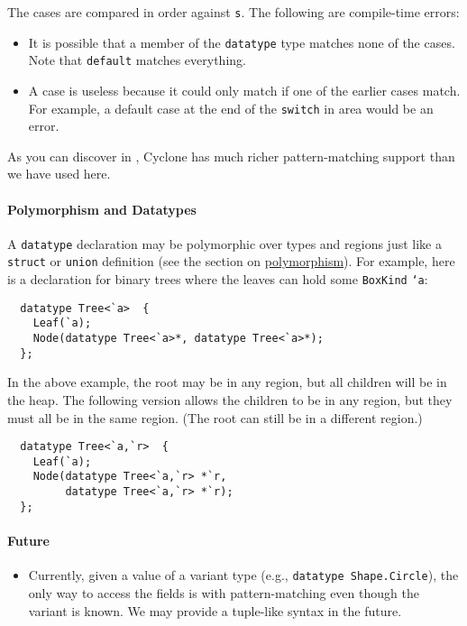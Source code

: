 The cases are compared in order against \texttt{s}.  The following are
compile-time errors:
\begin{itemize}
\item It is possible that a member of the \texttt{datatype} type matches
  none of the cases.  Note that \texttt{default} matches everything.
\item A case is useless because it could only match if one of the
  earlier cases match.  For example, a default case at the end of the
  \texttt{switch} in area would be an error.
\end{itemize}

As you can discover in , Cyclone has much
richer pattern-matching support than we have used here.

\paragraph{Polymorphism and Datatypes} A \texttt{datatype} declaration may be
polymorphic over types and regions just like a \texttt{struct}
or \texttt{union} definition (see the section on
\hyperlink{polymorphism}{polymorphism}).  For example, here is a
declaration for binary trees where the leaves can hold some
\texttt{BoxKind} \texttt{`a}:
\begin{verbatim}
  datatype Tree<`a>  {
    Leaf(`a);
    Node(datatype Tree<`a>*, datatype Tree<`a>*);
  };
\end{verbatim}

In the above example, the root may be in any region, but all children
will be in the heap.  The following version allows the children to be in any
region, but they must all be in the same region.  (The root can still
be in a different region.)

\begin{verbatim}
  datatype Tree<`a,`r>  {
    Leaf(`a);
    Node(datatype Tree<`a,`r> *`r, 
         datatype Tree<`a,`r> *`r);
  };
\end{verbatim}

\paragraph{Future}
\begin{itemize}
\item Currently, given a value of a variant type (e.g.,
  \texttt{datatype Shape.Circle}), the only way to access the fields is
  with pattern-matching even though the variant is known.  We may
  provide a tuple-like syntax in the future.
\end{itemize}

